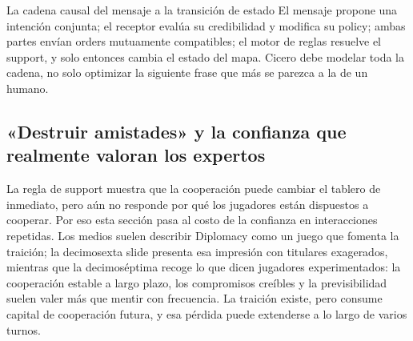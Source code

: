 
\begin{importantbox}{La cadena causal del mensaje a la transición de estado}
El mensaje propone una intención conjunta; el receptor evalúa su credibilidad y modifica su policy; ambas partes envían orders mutuamente compatibles; el motor de reglas resuelve el support, y solo entonces cambia el estado del mapa. Cicero debe modelar toda la cadena, no solo optimizar la siguiente frase que más se parezca a la de un humano.
\end{importantbox}

\subsection{«Destruir amistades» y la confianza que realmente valoran los expertos}

La regla de support muestra que la cooperación puede cambiar el tablero de inmediato, pero aún no responde por qué los jugadores están dispuestos a cooperar. Por eso esta sección pasa al costo de la confianza en interacciones repetidas. Los medios suelen describir Diplomacy como un juego que fomenta la traición; la decimosexta slide presenta esa impresión con titulares exagerados, mientras que la decimoséptima recoge lo que dicen jugadores experimentados: la cooperación estable a largo plazo, los compromisos creíbles y la previsibilidad suelen valer más que mentir con frecuencia. La traición existe, pero consume capital de cooperación futura, y esa pérdida puede extenderse a lo largo de varios turnos.




